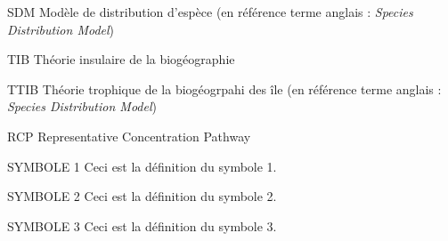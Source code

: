 
\tabledesmatieres






\listeabrev
\begin{liste}

\item[SDM] Modèle de distribution d'espèce (en référence terme anglais : \textit{Species Distribution Model})

\item[TIB] Théorie insulaire de la biogéographie

\item[TTIB] Théorie trophique de la biogéogrpahi des île (en référence terme anglais : \textit{Species Distribution Model})

\item[RCP]  Representative Concentration Pathway
\end{liste}


\listesymboles
\begin{liste}
\item[SYMBOLE 1] Ceci est la définition du symbole 1.

\item[SYMBOLE 2] Ceci est la définition du symbole 2.

\item[SYMBOLE 3] Ceci est la définition du symbole 3.
\end{liste}


\cleardoublepage
